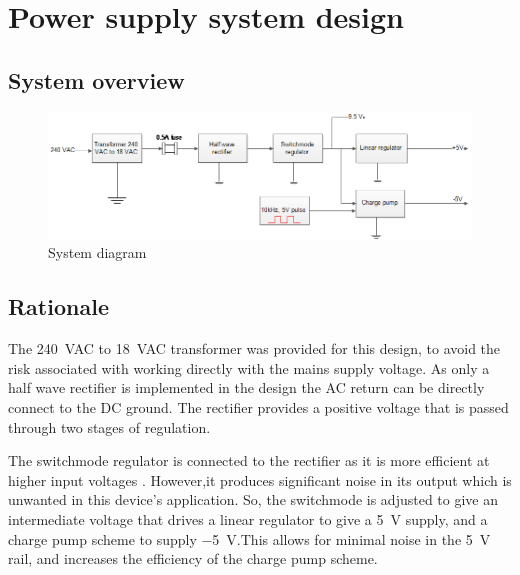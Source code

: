 \chapter{Power supply system design}
\section{System overview} \label{sec:literature_system}

\begin{figure}[h]
    \centering
    \includegraphics[width = 0.825\linewidth]{Figures/system_overview}
    \caption{System diagram}
    \label{fig:system_diagram}
\end{figure}

\section{Rationale}\label{sec:rationale_system}
The \SI{240}{VAC} to \SI{18}{VAC} transformer was provided for this design, to avoid the risk associated with working directly with the mains supply voltage. As only a half wave rectifier is implemented in the design the AC return can be directly connect to the DC ground. The rectifier provides a positive voltage that is passed through two stages of regulation. 

The switchmode regulator is connected to the rectifier as it is more efficient at higher input voltages \cite{regulators-main}. However,it produces significant noise in its output which is unwanted in this device's application. So, the switchmode is adjusted to give an intermediate voltage that drives a linear regulator to give a \SI{+5}{\volt} supply, and a charge pump scheme to supply \SI{-5}{\volt}.This allows for minimal noise in the \SI{+5}{\volt} rail, and increases the efficiency of the charge pump scheme. 







